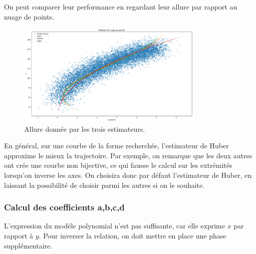 \documentclass[12pt]{article}
\begin{document}
    On peut comparer leur performance en regardant leur allure par rapport au nuage de points. 

    \begin{figure}[ht!]
        \centering
        \includegraphics[width=0.8\textwidth]{Images/Relation_ModelesVSPts.png}  
        \caption{Allure donnée par les trois estimateurs.}
    \end{figure}

    En général, sur une courbe de la forme recherchée, l'estimateur de Huber approxime le mieux la trajectoire. Par exemple, on remarque que les deux autres ont crée une courbe non bijective, ce qui fausse le calcul sur les extrémités lorsqu'on inverse les axes. On choisira donc par défaut l'estimateur de Huber, en laissant la possibilité de choisir parmi les autres si on le souhaite.

\subsubsection{Calcul des coefficients a,b,c,d}

    L'expression du modèle polynomial n'est pas suffisante, car elle exprime $x$ par rapport à $y$. Pour inverser la relation, on doit mettre en place une phase supplémentaire.
\end{document}
